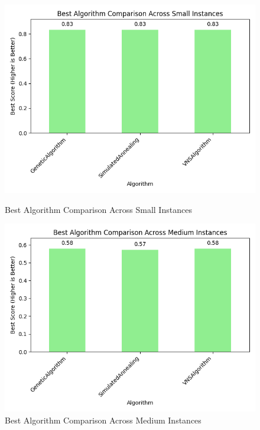 \documentclass[a4paper,12pt]{article}
\begin{document}
\begin{figure}[H]
    \centering
    \begin{minipage}{0.32\textwidth}
        \centering
        \includegraphics[width=\linewidth]{small_results.png}
        \caption{Best Algorithm Comparison Across Small Instances}
        \label{fig:small_results}
    \end{minipage}\hfill
    \begin{minipage}{0.32\textwidth}
        \centering
        \includegraphics[width=\linewidth]{medium_results.png}
        \caption{Best Algorithm Comparison Across Medium Instances}
        \label{fig:medium_results}
    \end{minipage}\hfill
    \begin{minipage}{0.32\textwidth}

\end{minipage}
\end{figure}
\end{document}
